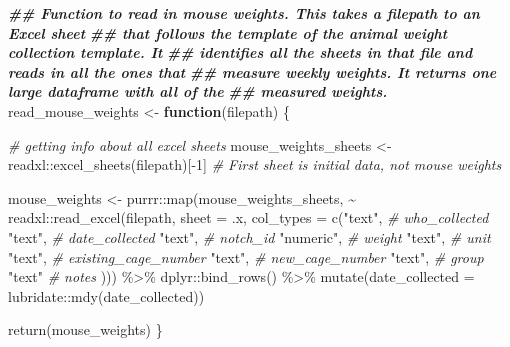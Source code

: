 \documentclass[
]{book}
\newenvironment{Shaded}{\begin{snugshade}}{\end{snugshade}}
\newcommand{\AttributeTok}[1]{\textcolor[rgb]{0.77,0.63,0.00}{#1}}
\newcommand{\CommentTok}[1]{\textcolor[rgb]{0.56,0.35,0.01}{\textit{#1}}}
\newcommand{\ControlFlowTok}[1]{\textcolor[rgb]{0.13,0.29,0.53}{\textbf{#1}}}
\newcommand{\DecValTok}[1]{\textcolor[rgb]{0.00,0.00,0.81}{#1}}
\newcommand{\DocumentationTok}[1]{\textcolor[rgb]{0.56,0.35,0.01}{\textbf{\textit{#1}}}}
\newcommand{\FunctionTok}[1]{\textcolor[rgb]{0.00,0.00,0.00}{#1}}
\newcommand{\NormalTok}[1]{#1}
\newcommand{\OtherTok}[1]{\textcolor[rgb]{0.56,0.35,0.01}{#1}}
\newcommand{\SpecialCharTok}[1]{\textcolor[rgb]{0.00,0.00,0.00}{#1}}
\newcommand{\StringTok}[1]{\textcolor[rgb]{0.31,0.60,0.02}{#1}}
\begin{document}
\begin{Shaded}
\begin{Highlighting}[]
\DocumentationTok{\#\# Function to read in mouse weights. This takes a filepath to an Excel sheet}
\DocumentationTok{\#\# that follows the template of the animal weight collection template. It }
\DocumentationTok{\#\# identifies all the sheets in that file and reads in all the ones that }
\DocumentationTok{\#\# measure weekly weights. It returns one large dataframe with all of the }
\DocumentationTok{\#\# measured weights. }
\NormalTok{read\_mouse\_weights }\OtherTok{\textless{}{-}} \ControlFlowTok{function}\NormalTok{(filepath) \{}
  
  \CommentTok{\# getting info about all excel sheets}
\NormalTok{  mouse\_weights\_sheets }\OtherTok{\textless{}{-}}\NormalTok{ readxl}\SpecialCharTok{::}\FunctionTok{excel\_sheets}\NormalTok{(filepath)[}\SpecialCharTok{{-}}\DecValTok{1}\NormalTok{] }\CommentTok{\# First sheet is initial data, not mouse weights}
  
\NormalTok{  mouse\_weights }\OtherTok{\textless{}{-}}\NormalTok{ purrr}\SpecialCharTok{::}\FunctionTok{map}\NormalTok{(mouse\_weights\_sheets, }
                              \SpecialCharTok{\textasciitilde{}}\NormalTok{ readxl}\SpecialCharTok{::}\FunctionTok{read\_excel}\NormalTok{(filepath, }\AttributeTok{sheet =}\NormalTok{ .x, }
                                                   \AttributeTok{col\_types =} \FunctionTok{c}\NormalTok{(}\StringTok{"text"}\NormalTok{,   }\CommentTok{\# who\_collected}
                                                                 \StringTok{"text"}\NormalTok{,   }\CommentTok{\# date\_collected}
                                                                 \StringTok{"text"}\NormalTok{,   }\CommentTok{\# notch\_id}
                                                                 \StringTok{"numeric"}\NormalTok{, }\CommentTok{\# weight}
                                                                 \StringTok{"text"}\NormalTok{,   }\CommentTok{\# unit}
                                                                 \StringTok{"text"}\NormalTok{,   }\CommentTok{\# existing\_cage\_number}
                                                                 \StringTok{"text"}\NormalTok{,   }\CommentTok{\# new\_cage\_number}
                                                                 \StringTok{"text"}\NormalTok{,   }\CommentTok{\# group}
                                                                 \StringTok{"text"}    \CommentTok{\# notes}
\NormalTok{                                                                 ))) }\SpecialCharTok{\%\textgreater{}\%} 
\NormalTok{    dplyr}\SpecialCharTok{::}\FunctionTok{bind\_rows}\NormalTok{() }\SpecialCharTok{\%\textgreater{}\%} 
    \FunctionTok{mutate}\NormalTok{(}\AttributeTok{date\_collected =}\NormalTok{ lubridate}\SpecialCharTok{::}\FunctionTok{mdy}\NormalTok{(date\_collected))}

  \FunctionTok{return}\NormalTok{(mouse\_weights)}
\NormalTok{\}}
\end{Highlighting}
\end{Shaded}
\end{document}
